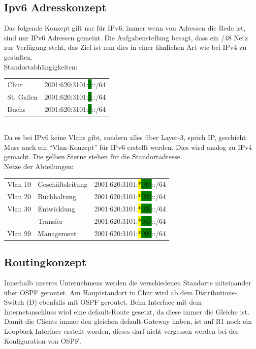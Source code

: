 \documentclass[12pt,a4paper,titlepage]{article}
\begin{document}
\subsection{Ipv6 Adresskonzept} 
Das folgende Konzept gilt nur für IPv6, immer wenn von Adressen die Rede ist, sind nur IPv6 Adressen gemeint.
Die Aufgabenstellung besagt, dass ein /48 Netz zur Verfügung steht, das Ziel ist nun dies in einer ähnlichen Art wie bei IPv4 zu gestalten. \\
\newline
Standortabhängigkeiten:\\ 
\newline
\hspace*{1cm} 
\begin{tabular}{ll}
    Chur & 2001:620:3101:\colorbox{green}{1}::/64\\
    St. Gallen & 2001:620:3101:\colorbox{green}{2}::/64\\
    Buchs & 2001:620:3101:\colorbox{green}{3}::/64\\
\end{tabular}\\
\newline
Da es bei IPv6 keine Vlans gibt, sondern alles über Layer-3, sprich IP, geschieht. Muss auch ein “Vlan-Konzept” für IPv6 erstellt werden. Dies wird analog zu IPv4 gemacht. Die gelben Sterne stehen für die Standortadresse.\\\newline
Netze der Abteilungen: \\
\newline
\hspace*{1cm} 
\begin{tabular}{lll}
     Vlan 10 & Geschäftsleitung & 2001:620:3101:\colorbox{yellow}{*}\colorbox{green}{010}::/64\\
     Vlan 20 & Buchhaltung & 2001:620:3101:\colorbox{yellow}{*}\colorbox{green}{020}::/64\\
     Vlan 30 & Entwicklung & 2001:620:3101:\colorbox{yellow}{*}\colorbox{green}{030}::/64\\
             & Transfer & 2001:620:3101:\colorbox{yellow}{*}\colorbox{green}{040}::/64\\
     Vlan 99 & Management & 2001:620:3101:\colorbox{yellow}{*}\colorbox{green}{099}::/64\\
\end{tabular}
\newpage



\subsection{Routingkonzept} 
Innerhalb unseres Unternehmens werden die verschiedenen Standorte miteinander über OSPF geroutet. Am Hauptstandort in Chur wird ab dem Distributions-Switch (D) ebenfalls mit OSPF geroutet. Beim Interface mit dem Internetanschluss wird eine default-Route gesetzt, da diese immer die Gleiche ist. Damit die Clients immer den gleichen default-Gateway haben, ist auf R1 noch ein Loopback-Interface erstellt worden, dieses darf nicht vergessen werden bei der Konfiguration von OSPF.
\end{document}
